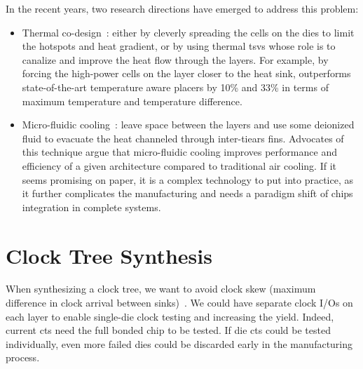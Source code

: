 \documentclass[11pt,a4paper]{report} %
\theoremstyle{customdef}
\begin{document}
In the recent years, two research directions have emerged to address this problem:
\begin{itemize}
	\item Thermal co-design~\citep{Cong2004, Cong2007, Minz2008, Ryu2011, Zhang2006}: either by cleverly spreading the cells on the dies to limit the hotspots and heat gradient, or by using thermal \gls{tsv}s whose role is to canalize and improve the heat flow through the layers.
	For example, by forcing the high-power cells on the layer closer to the heat sink, \citet{Athikulwongse2014} outperforms state-of-the-art temperature aware placers by 10\% and 33\% in terms of maximum temperature and temperature difference.
	
	\item Micro-fluidic cooling~\citep{Koo2005, Serafy2013, Serafy2016}: leave space between the layers and use some deionized fluid to evacuate the heat channeled through inter-tiears fins.
	Advocates of this technique argue that micro-fluidic cooling improves performance and efficiency of a given architecture compared to traditional air cooling.
	If it seems promising on paper, it is a complex technology to put into practice, as it further complicates the manufacturing and needs a paradigm shift of chips integration in complete systems.
\end{itemize}



\section{Clock Tree Synthesis}
When synthesizing a clock tree, we want to avoid clock skew (maximum difference in clock arrival between sinks)~\citep{Lu2017}.
We could have separate clock I/Os on each layer to enable single-die clock testing and increasing the yield.
Indeed, current \gls{cts} need the full bonded chip to be tested.
If die \gls{cts} could be tested individually, even more failed dies could be discarded early in the manufacturing process.
\end{document}

